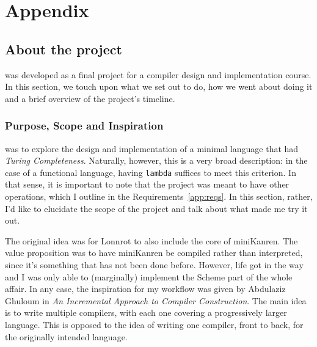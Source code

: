 \chapter*{Appendix}

\section*{About the project}
 was developed as a final project for a compiler design and implementation
course. In this section, we touch upon what we set out to do, how we went about doing it
and a brief overview of the project's timeline.

\subsection*{Purpose, Scope and Inspiration}
 was to explore the design and implementation of a minimal
language that had \textit{Turing Completeness}. Naturally, however, this is
a very broad description: in the case of a functional language, having \texttt{lambda} suffices
to meet this criterion. In that sense, it is important to note that the project was meant to have
other operations, which I outline in the Requirements~\ref{app:reqs}. In this section, rather,
I'd like to elucidate the scope of the project
and talk about what made me try it out.

The original idea was for Lonnrot to also include the core of miniKanren. The value proposition
was to have miniKanren be compiled rather than interpreted, since it's something that has
not been done before. However, life got in the way and I was only able to (marginally) implement
the Scheme part of the whole affair. In any case, the inspiration for my workflow was given by
Abdulaziz Ghuloum in \textit{An Incremental Approach to Compiler Construction}.
The main idea is to write multiple compilers, with each one covering a progressively larger language.
This is opposed to the idea of writing one compiler, front to back, for the originally intended
language.

